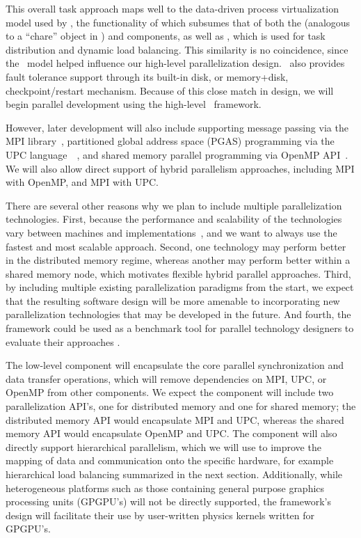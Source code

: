 \documentclass[10pt,twocolumn]{article}
\begin{document}
This overall task approach maps well to the data-driven process
virtualization model used by \charm, the functionality of which
subsumes that of both the  (analogous to a ``chare'' object
in \charm) and  components, as well as
, which is used for task distribution and dynamic
load balancing.  This similarity is no coincidence, since the \charm\
model helped influence our high-level parallelization design.  \charm\
also provides fault tolerance support through its built-in disk, or
memory+disk, checkpoint/restart mechanism.  Because of this close
match in design, we will begin parallel development using the
high-level \charm\ framework.

However, later development will also include supporting message
passing via the MPI library~\cite{wwwmpi}, partitioned global address
space (PGAS) programming via the UPC
language~\cite{wwwupc}~\cite{upc}, and shared memory parallel
programming via OpenMP API~\cite{wwwopenmp}.  We will also allow
direct support of hybrid parallelism approaches, including MPI with
OpenMP, and MPI with UPC. 

There are several other reasons why we plan to include multiple
parallelization technologies.  First, because the performance and
scalability of the technologies vary between machines and
implementations~\cite{MaTa09}, and we want to always use the fastest
and most scalable approach.  Second, one technology may perform better
in the distributed memory regime, whereas another may perform better
within a shared memory node, which motivates flexible hybrid parallel
approaches.  Third, by including multiple existing parallelization
paradigms from the start, we expect that the resulting software design
will be more amenable to incorporating new parallelization
technologies that may be developed in the future.  And fourth, the
framework could be used as a benchmark tool for parallel technology
designers to evaluate their approaches \cite{WeSu07}.

The low-level  component will encapsulate the core
parallel synchronization and data transfer operations, which will
remove dependencies on MPI, UPC, or OpenMP from other components.  We
expect the \code{Parallel} component will include two parallelization
API's, one for distributed memory and one for shared memory; the
distributed memory API would encapsulate MPI and UPC, whereas the
shared memory API would encapsulate OpenMP and UPC.  The
\code{Parallel} component will also directly support hierarchical
parallelism, which we will use to improve the mapping of data and
communication onto the specific hardware, for example hierarchical
load balancing summarized in the next section.  Additionally, while
heterogeneous platforms such as those containing general purpose
graphics processing units (GPGPU's) will not be directly supported,
the framework's design will facilitate their use by user-written
physics kernels written for GPGPU's.
\end{document}
